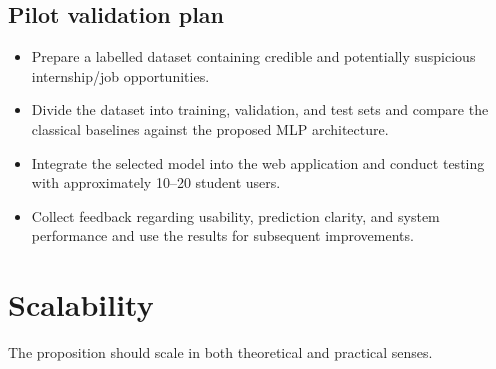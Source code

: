 \documentclass[11pt,a4paper]{article}
\newcommand{\BvrHint}[1]{%
  {\normalfont\normalsize\itshape\hfill #1}}
\begin{document}
\subsection{Pilot validation plan%
\BvrHint{}}

\begin{itemize}[leftmargin=0.7cm]

    \item Prepare a labelled dataset containing credible and potentially
    suspicious internship/job opportunities.

    \item Divide the dataset into training, validation, and test sets and
    compare the classical baselines against the proposed MLP architecture.

    \item Integrate the selected model into the web application and conduct
    testing with approximately 10--20 student users.

    \item Collect feedback regarding usability, prediction clarity, and
    system performance and use the results for subsequent improvements.
\end{itemize}

\section{Scalability%
\BvrHint{}}

The proposition should scale in both theoretical and practical senses.
\end{document}
